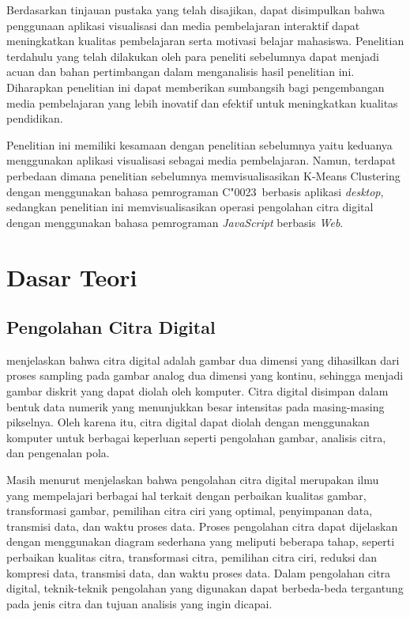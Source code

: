 Berdasarkan tinjauan pustaka yang telah disajikan, dapat disimpulkan bahwa penggunaan aplikasi visualisasi dan media pembelajaran interaktif dapat meningkatkan kualitas pembelajaran serta motivasi belajar mahasiswa. Penelitian terdahulu yang telah dilakukan oleh para peneliti sebelumnya dapat menjadi acuan dan bahan pertimbangan dalam menganalisis hasil penelitian ini. Diharapkan penelitian ini dapat memberikan sumbangsih bagi pengembangan media pembelajaran yang lebih inovatif dan efektif untuk meningkatkan kualitas pendidikan.

Penelitian ini memiliki kesamaan dengan penelitian sebelumnya yaitu keduanya menggunakan aplikasi visualisasi sebagai media pembelajaran. Namun, terdapat perbedaan dimana penelitian sebelumnya memvisualisasikan K-Means Clustering dengan menggunakan bahasa pemrograman C\char"0023\ berbasis aplikasi \textit{desktop}, sedangkan penelitian ini memvisualisasikan operasi pengolahan citra digital dengan menggunakan bahasa pemrograman \textit{JavaScript} berbasis \textit{Web}.

\section{Dasar Teori}
\subsection{Pengolahan Citra Digital}
\textcite{munantri2020aplikasi} menjelaskan bahwa citra digital adalah gambar dua dimensi yang dihasilkan dari proses sampling pada gambar analog dua dimensi yang kontinu, sehingga menjadi gambar diskrit yang dapat diolah oleh komputer. Citra digital disimpan dalam bentuk data numerik yang menunjukkan besar intensitas pada masing-masing pikselnya. Oleh karena itu, citra digital dapat diolah dengan menggunakan komputer untuk berbagai keperluan seperti pengolahan gambar, analisis citra, dan pengenalan pola.

Masih menurut \textcite{munantri2020aplikasi} menjelaskan bahwa pengolahan citra digital merupakan ilmu yang mempelajari berbagai hal terkait dengan perbaikan kualitas gambar, transformasi gambar, pemilihan citra ciri yang optimal, penyimpanan data, transmisi data, dan waktu proses data. Proses pengolahan citra dapat dijelaskan dengan menggunakan diagram sederhana yang meliputi beberapa tahap, seperti perbaikan kualitas citra, transformasi citra, pemilihan citra ciri, reduksi dan kompresi data, transmisi data, dan waktu proses data. Dalam pengolahan citra digital, teknik-teknik pengolahan yang digunakan dapat berbeda-beda tergantung pada jenis citra dan tujuan analisis yang ingin dicapai.

